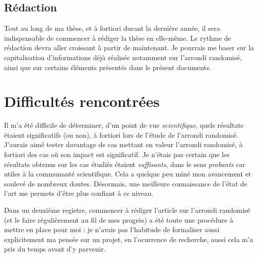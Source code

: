 \documentclass[a4paper,11pt]{article}
\begin{document}


\subsection{Rédaction}
Tout au long de ma thèse, et à fortiori durant la dernière année, il sera indispensable de commencer à rédiger la thèse en elle-même.
Le rythme de rédaction devra aller croissant à partir de maintenant. Je pourrais me baser sur la capitalisation d'informations déjà réalisée notamment sur l'arrondi randomisé, ainsi que sur certains éléments présentés dans le présent documents.

\section{Difficultés rencontrées}
Il m'a été difficile de déterminer, d'un point de vue \textit{scientifique}, quels résultats étaient significatifs (ou non), à fortiori lors de l'étude de l'arrondi randomisé. J'aurais aimé tester davantage de cas mettant en valeur l'arrondi randomisé, à fortiori des cas où son impact est significatif.
Je n'étais pas certain que les résultats obtenus sur les cas étudiés étaient \textit{suffisants}, dans le sens \textit{probants} car utiles à la communauté scientifique. Cela a quelque peu miné mon avancement et soulevé de nombreux doutes. Désormais, une meilleure connaissance de l'état de l'art me permets d'être plus confiant à ce niveau.

Dans un deuxième registre, commencer à rédiger l'article sur l'arrondi randomisé (et le faire régulièrement au fil de mes progrès) a été toute une procédure à mettre en place pour moi : je n'avais pas l'habitude de formaliser aussi explicitement ma pensée sur un projet, en l'ocurrence de recherche, aussi cela m'a pris du temps avant d'y parvenir.
\end{document}
